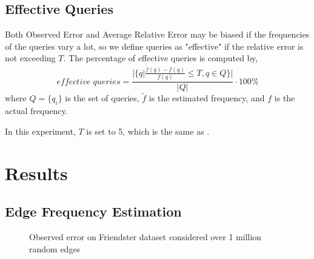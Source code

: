 \subsection{Effective Queries \cite{DBLP}}
Both Observed Error and Average Relative Error may be biased if the frequencies of the queries vary a lot, so we define queries as "effective" if the relative error is not exceeding $T$. The percentage of effective queries is computed by,
\[
effective\;queries = \frac{|\{q|\frac{\tilde{f}(q)-f(q)}{f(q)} \leq T, q \in Q\}|}{|Q|} \cdot 100\%
\]
where $Q = \{q_i\}$ is the set of queries, $\tilde{f}$ is the estimated frequency, and $f$ is the actual frequency.

In this experiment, $T$ is set to 5, which is the same as \cite{DBLP}.


\clearpage
\section{Results}

\subsection{Edge Frequency Estimation}

\begin{figure}[!htbp]
\centering
{}
\caption{Observed error on Friendster dataset considered over 1 million random edges} \label{fig:F11}
\end{figure}

